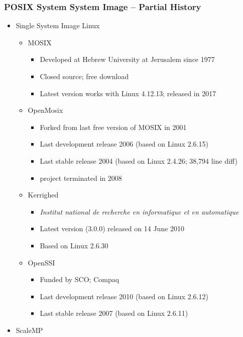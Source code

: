 \documentclass{beamer}
\begin{document}
\begin{frame}
\frametitle{POSIX System System Image -- Partial History}
\begin{itemize}
\item Single System Image Linux
\begin{itemize}
\item MOSIX
\begin{itemize}
\item Developed at Hebrew University at Jerusalem since 1977
\item Closed source; free download
\item Latest version works with Linux 4.12.13; released in 2017
\end{itemize}
\item OpenMosix
\begin{itemize}
\item Forked from last free version of MOSIX in 2001
\item Last development release 2006 (based on Linux 2.6.15)
\item Last stable release 2004 (based on Linux 2.4.26; 38,794 line diff)
\item project terminated in 2008
\end{itemize}
\item Kerrighed
\begin{itemize}
\item {\it Institut national de recherche en informatique et en automatique}
\item Latest version (3.0.0) released on 14 June 2010
\item Based on Linux 2.6.30
\end{itemize}
\item OpenSSI
\begin{itemize}
\item Funded by SCO; Compaq
\item Last development release 2010 (based on Linux 2.6.12)
\item Last stable release 2007 (based on Linux 2.6.11)
\end{itemize}
\end{itemize}
\item ScaleMP
\end{itemize}
\end{frame}
\end{document}
